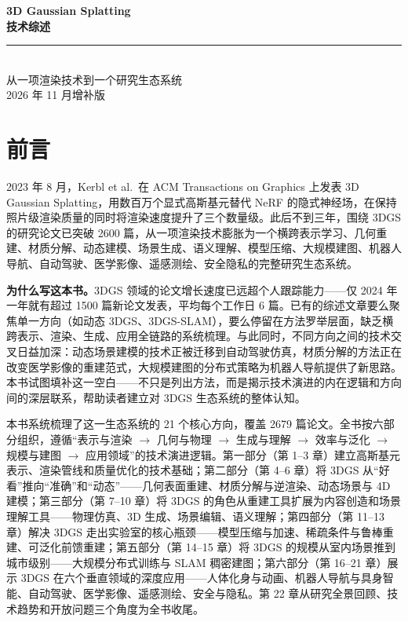 



\frontmatter
\begin{titlepage}
\centering
\vspace*{0.15\textheight}
{\fontsize{28pt}{36pt}\selectfont\bfseries 3D Gaussian Splatting\\[0.3em]
技术综述}\\[1cm]
{\color{techblue}\rule{4cm}{0.5pt}}\\[1cm]
{\large\color{techgray} 从一项渲染技术到一个研究生态系统}\\[2cm]
{\small\color{techlightgray} 2026 年 11 月增补版}
\end{titlepage}

\tableofcontents

\chapter{前言}

2023 年 8 月，Kerbl et al.\ 在 ACM Transactions on Graphics 上发表 3D Gaussian Splatting，用数百万个显式高斯基元替代 NeRF 的隐式神经场，在保持照片级渲染质量的同时将渲染速度提升了三个数量级。此后不到三年，围绕 3DGS 的研究论文已突破 2600 篇，从一项渲染技术膨胀为一个横跨表示学习、几何重建、材质分解、动态建模、场景生成、语义理解、模型压缩、大规模建图、机器人导航、自动驾驶、医学影像、遥感测绘、安全隐私的完整研究生态系统。

\textbf{为什么写这本书。}3DGS 领域的论文增长速度已远超个人跟踪能力——仅 2024 年一年就有超过 1500 篇新论文发表，平均每个工作日 6 篇。已有的综述文章要么聚焦单一方向（如动态 3DGS、3DGS-SLAM），要么停留在方法罗举层面，缺乏横跨表示、渲染、生成、应用全链路的系统梳理。与此同时，不同方向之间的技术交叉日益加深：动态场景建模的技术正被迁移到自动驾驶仿真，材质分解的方法正在改变医学影像的重建范式，大规模建图的分布式策略为机器人导航提供了新思路。本书试图填补这一空白——不只是列出方法，而是揭示技术演进的内在逻辑和方向间的深层联系，帮助读者建立对 3DGS 生态系统的整体认知。

本书系统梳理了这一生态系统的 21 个核心方向，覆盖 2679 篇论文。全书按六部分组织，遵循``表示与渲染 $\to$ 几何与物理 $\to$ 生成与理解 $\to$ 效率与泛化 $\to$ 规模与建图 $\to$ 应用领域''的技术演进逻辑。第一部分（第 1--3 章）建立高斯基元表示、渲染管线和质量优化的技术基础；第二部分（第 4--6 章）将 3DGS 从``好看''推向``准确''和``动态''——几何表面重建、材质分解与逆渲染、动态场景与 4D 建模；第三部分（第 7--10 章）将 3DGS 的角色从重建工具扩展为内容创造和场景理解工具——物理仿真、3D 生成、场景编辑、语义理解；第四部分（第 11--13 章）解决 3DGS 走出实验室的核心瓶颈——模型压缩与加速、稀疏条件与鲁棒重建、可泛化前馈重建；第五部分（第 14--15 章）将 3DGS 的规模从室内场景推到城市级别——大规模分布式训练与 SLAM 稠密建图；第六部分（第 16--21 章）展示 3DGS 在六个垂直领域的深度应用——人体化身与动画、机器人导航与具身智能、自动驾驶、医学影像、遥感测绘、安全与隐私。第 22 章从研究全景回顾、技术趋势和开放问题三个角度为全书收尾。

